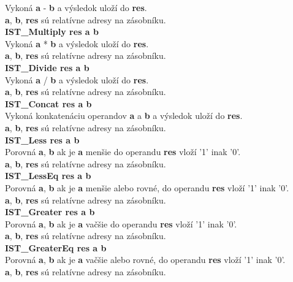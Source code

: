 \documentclass[12pt,a4paper,titlepage,final]{article}
\begin{document}
Vykoná \textbf{a} - \textbf{b} a výsledok uloží do \textbf{res}.\\
\textbf{a}, \textbf{b}, \textbf{res} sú relatívne adresy na zásobníku.\\
\textbf{IST\_Multiply res a b}\\
Vykoná \textbf{a} * \textbf{b} a výsledok uloží do \textbf{res}.\\
\textbf{a}, \textbf{b}, \textbf{res} sú relatívne adresy na zásobníku.\\
\textbf{IST\_Divide res a b}\\
Vykoná \textbf{a} / \textbf{b} a výsledok uloží do \textbf{res}.\\
\textbf{a}, \textbf{b}, \textbf{res} sú relatívne adresy na zásobníku.\\
\textbf{IST\_Concat res a b}\\
Vykoná konkatenáciu operandov \textbf{a} a \textbf{b} a výsledok uloží do \textbf{res}.\\
\textbf{a}, \textbf{b}, \textbf{res} sú relatívne adresy na zásobníku.\\
\textbf{IST\_Less res a b}\\
Porovná \textbf{a}, \textbf{b} ak je \textbf{a} menšie do operandu \textbf{res} vloží '1' inak '0'.\\
\textbf{a}, \textbf{b}, \textbf{res} sú relatívne adresy na zásobníku.\\
\textbf{IST\_LessEq res a b}\\
Porovná \textbf{a}, \textbf{b} ak je \textbf{a} menšie alebo rovné, do operandu \textbf{res} vloží '1' inak '0'.\\
\textbf{a}, \textbf{b}, \textbf{res} sú relatívne adresy na zásobníku.\\
\textbf{IST\_Greater res a b}\\
Porovná \textbf{a}, \textbf{b} ak je \textbf{a} vačšie do operandu \textbf{res} vloží '1' inak '0'.\\
\textbf{a}, \textbf{b}, \textbf{res} sú relatívne adresy na zásobníku.\\
\textbf{IST\_GreaterEq res a b}\\
Porovná \textbf{a}, \textbf{b} ak je \textbf{a} vačšie alebo rovné, do operandu \textbf{res} vloží '1' inak '0'.\\
\textbf{a}, \textbf{b}, \textbf{res} sú relatívne adresy na zásobníku.\\

\end{document}
